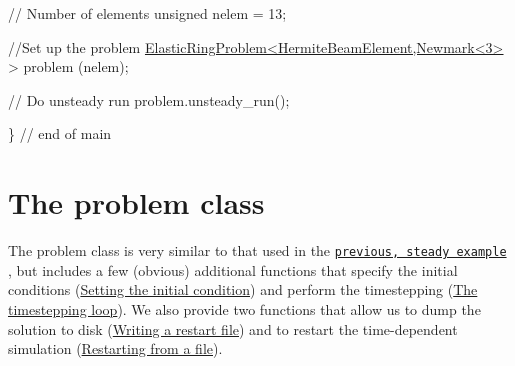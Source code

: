 \begin{DoxyCodeInclude}

 \textcolor{comment}{// Number of elements}
 \textcolor{keywordtype}{unsigned} nelem = 13;

 \textcolor{comment}{//Set up the problem}
 \hyperlink{classElasticRingProblem}{ElasticRingProblem<HermiteBeamElement,Newmark<3>} > problem
      (nelem);

 \textcolor{comment}{// Do unsteady run}
 problem.unsteady\_run();

\} \textcolor{comment}{// end of main}

\end{DoxyCodeInclude}




 

\hypertarget{index_problem}{}\section{The problem class}\label{index_problem}
The problem class is very similar to that used in the \href{../../steady_ring/html/index.html}{\tt previous, steady example} , but includes a few (obvious) additional functions that specify the initial conditions (\hyperlink{index_IC}{Setting the initial condition}) and perform the timestepping (\hyperlink{index_unsteady_run}{The timestepping loop}). We also provide two functions that allow us to dump the solution to disk (\hyperlink{index_dump}{Writing a restart file}) and to restart the time-\/dependent simulation (\hyperlink{index_restart}{Restarting from a file}).

